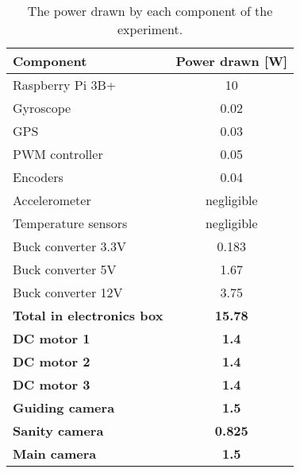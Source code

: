 
\begin{center}
\begin{table}[H]
\centering
    \begin{tabular}{ | l | c | }
    \hline
    \textbf{Component} & \textbf{Power drawn [W]}\\ 
    \hline
    Raspberry Pi 3B+  & 10\\
    \hline
    Gyroscope & 0.02\\ 
    \hline
    GPS  & 0.03\\ 
    \hline
    PWM controller & 0.05\\ 
    \hline 
    Encoders  & 0.04 \\ 
    \hline
    Accelerometer  & negligible \\ 
    \hline
    Temperature sensors  & negligible \\ 
    \hline
    Buck converter 3.3V  & 0.183 \\ 
    \hline
    Buck converter 5V  & 1.67 \\ 
    \hline
    Buck converter 12V  & 3.75 \\ 
    \hline
    \textbf{Total in electronics box}  & \textbf{15.78} \\ 
    \hline
    \textbf{DC motor 1}  & \textbf{1.4} \\
    \hline
    \textbf{DC motor 2}  & \textbf{1.4} \\ 
    \hline
    \textbf{DC motor 3}  & \textbf{1.4} \\
    \hline
    \textbf{Guiding camera}  & \textbf{1.5} \\
    \hline
    \textbf{Sanity camera}  & \textbf{0.825} \\ 
    \hline
    \textbf{Main camera}  & \textbf{1.5}\\ 
    \hline
  \end{tabular}
\caption{The power drawn by each component of the experiment.}
\end{table}
\label{tab: thermal power}
\end{center}